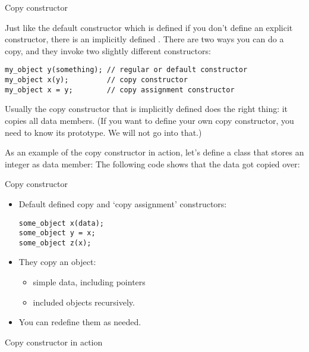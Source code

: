  {Copy constructor}
\label{sec:copy-constructor}

Just like the default constructor which is defined if you don't define
an explicit constructor, there is an implicitly defined
.
%
There are two ways you can do a copy, and they
invoke two slightly different constructors:
\begin{lstlisting}
my_object y(something); // regular or default constructor
my_object x(y);         // copy constructor
my_object x = y;        // copy assignment constructor
\end{lstlisting}
Usually the copy constructor that is implicitly defined does the right
thing: it copies all data members. (If you want to define your own copy
constructor, you need to know its prototype. We will not go into that.)

As an example of the copy constructor in action,
let's define a class that stores an integer as data member:
%
%
The following code shows that the data got copied over:
%

\begin{slide}{Copy constructor}
  \label{sl:class-copy}
  \begin{multicols}{2}
    \begin{itemize}
    \item  Default defined copy and `copy assignment' constructors:
\begin{lstlisting}
some_object x(data);
some_object y = x;
some_object z(x);
\end{lstlisting}
    \item They copy an object:
      \begin{itemize}
      \item simple data, including pointers
      \item included objects recursively.
      \end{itemize}
    \item You can redefine them as needed.
    \end{itemize}
    \vfill\columnbreak
  \lstset{style=snippetcode}
  \end{multicols}
\end{slide}

\begin{slide}{Copy constructor in action}
  \label{sl:class-copy-out}
\end{slide}

